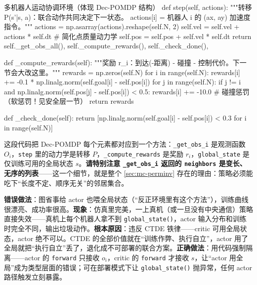 \begin{codebox}[Python]{多机器人运动协调环境（体现 Dec-POMDP 结构）}
    def step(self, actions):
        """转移 P(s'|s, a)：联合动作共同决定下一状态。
        actions[i] = 机器人 i 的 (ax, ay) 加速度指令。"""
        actions = np.asarray(actions).reshape(self.N, 2)
        self.vel = self.vel + actions * self.dt          # 简化点质量动力学
        self.pos = self.pos + self.vel * self.dt
        return self._get_obs_all(), self._compute_rewards(), self._check_done(), {}

    def _compute_rewards(self):
        """奖励 r_i：到达(-距离) - 碰撞 - 控制代价。下一节会大改这里。"""
        rewards = np.zeros(self.N)
        for i in range(self.N):
            rewards[i] += -0.1 * np.linalg.norm(self.goal[i] - self.pos[i])
            for j in range(self.N):
                if j != i and np.linalg.norm(self.pos[j] - self.pos[i]) < 0.5:
                    rewards[i] += -10.0          # 碰撞惩罚（软惩罚！见安全层一节）
        return rewards

    def _check_done(self):
        return [np.linalg.norm(self.goal[i] - self.pos[i]) < 0.3
                for i in range(self.N)]
\end{codebox}

这段代码把 Dec-POMDP 每个元素都对应到一个方法：\verb|_get_obs_i| 是观测函数 $O_i$，\verb|step| 里的动力学是转移 $P$，\verb|_compute_rewards| 是奖励 $r_i$，\verb|global_state| 是仅训练可用的全局状态 $s$。\textbf{请特别注意 \texttt{\_get\_obs\_i} 返回的 \texttt{neighbors} 是变长、无序的列表}——这一个细节，就是整个 \cref{sec:mc-perminv} 存在的理由：策略必须能吃下“长度不定、顺序无关”的邻居集合。

\begin{pitfall}
\textbf{错误做法}：图省事给 actor 也喂全局状态（“反正环境里有这个方法”），训练曲线很漂亮、成功率很高。\textbf{现象}：仿真里完美，一上真机（或一旦没有中央通信）策略直接失效——真机上每个机器人拿不到 \verb|global_state()|，actor 输入分布和训练时完全不同，输出垃圾动作。\textbf{根本原因}：违反 CTDE 铁律——critic 可用全局状态，actor 绝不可以。CTDE 的全部价值就在“训练作弊、执行自立”，actor 用了全局就把“执行自立”丢了，退化成不可部署的联合方案。\textbf{正确做法}：用代码强制隔离——actor 的 \verb|forward| 只接收 $o_i$，critic 的 \verb|forward| 才接收 $s$，让“actor 用全局”成为类型层面的错误；可在部署模式下让 \verb|global_state()| 抛异常，任何 actor 路径触发立刻暴露。
\end{pitfall}


